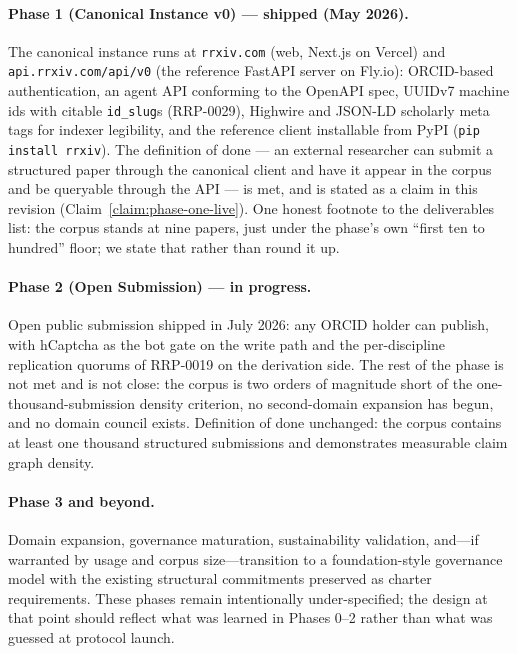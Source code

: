 \documentclass[11pt]{rrxiv}
\begin{document}
\paragraph{Phase 1 (Canonical Instance v0) --- shipped (May 2026).} The canonical instance runs at \texttt{rrxiv.com} (web, Next.js on Vercel) and \texttt{api.rrxiv.com/api/v0} (the reference FastAPI server on Fly.io): ORCID-based authentication, an agent API conforming to the OpenAPI spec, UUIDv7 machine ids with citable \texttt{id\_slug}s (RRP-0029), Highwire and JSON-LD scholarly meta tags for indexer legibility, and the reference client installable from PyPI (\texttt{pip install rrxiv}). The definition of done --- an external researcher can submit a structured paper through the canonical client and have it appear in the corpus and be queryable through the API --- is met, and is stated as a claim in this revision (Claim~\ref{claim:phase-one-live}). One honest footnote to the deliverables list: the corpus stands at nine papers, just under the phase's own ``first ten to hundred'' floor; we state that rather than round it up.

\paragraph{Phase 2 (Open Submission) --- in progress.} Open public submission shipped in July 2026: any ORCID holder can publish, with hCaptcha as the bot gate on the write path and the per-discipline replication quorums of RRP-0019 on the derivation side. The rest of the phase is not met and is not close: the corpus is two orders of magnitude short of the one-thousand-submission density criterion, no second-domain expansion has begun, and no domain council exists. Definition of done unchanged: the corpus contains at least one thousand structured submissions and demonstrates measurable claim graph density.

\paragraph{Phase 3 and beyond.} Domain expansion, governance maturation, sustainability validation, and---if warranted by usage and corpus size---transition to a foundation-style governance model with the existing structural commitments preserved as charter requirements. These phases remain intentionally under-specified; the design at that point should reflect what was learned in Phases 0--2 rather than what was guessed at protocol launch.
\end{document}
